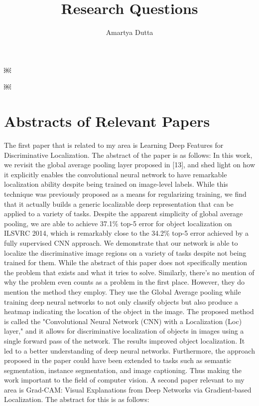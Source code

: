 \documentclass[11pt]{article}
\title{\textbf{Research Questions}}
\author{Amartya Dutta}
\date{}
\begin{document}
￼
\clearpage\maketitle
\thispagestyle{empty}
￼
\section{ Abstracts of Relevant Papers}
The first paper that is related to my area is Learning Deep Features for Discriminative Localization. The abstract of the paper is as follows: \newline 
In this work, we revisit the global average pooling layer proposed in [13], and shed light on how it explicitly enables the convolutional neural network to have remarkable localization ability despite being trained on image-level labels. While this technique was previously proposed as a means for regularizing training, we find that it actually builds a generic localizable deep representation that can be applied to a variety of tasks. Despite the apparent simplicity of global average pooling, we are able to achieve 37.1\% top-5 error for object localization on ILSVRC 2014, which is remarkably close to the 34.2\% top-5 error achieved by a fully supervised CNN approach. We demonstrate that our network is able to localize the discriminative image regions on a variety of tasks despite not being trained for them. \newline 
While the abstract of this paper does not specifically mention the problem that exists and what it tries to solve. Similarly, there's no mention of why the problem even counts as a problem in the first place. However, they do mention the method they employ. They use the Global Average pooling while training deep neural networks to not only classify objects but also produce a heatmap indicating the location of the object in the image. The proposed method is called the "Convolutional Neural Network (CNN) with a Localization (Loc) layer," and it allows for discriminative localization of objects in images using a single forward pass of the network. The results improved object localization. It led to a better understanding of deep neural networks.  Furthermore, the approach proposed in the paper could have been extended to tasks such as semantic segmentation, instance segmentation, and image captioning. Thus making the work important to the field of computer vision.\newline
A second paper relevant to my area is Grad-CAM: Visual Explanations from Deep Networks via Gradient-based Localization. The abstract for this is as follows: \newline 
\end{document}
